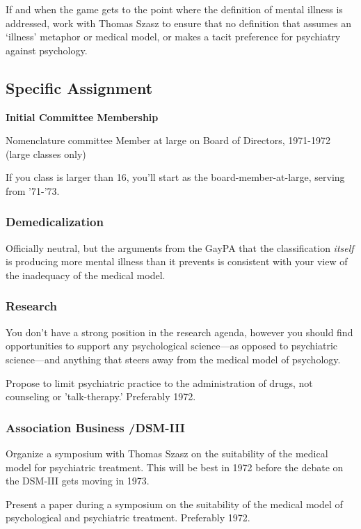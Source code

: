 \begin{refsection}
If and when the game gets to the point where the definition of mental illness is addressed, work with Thomas Szasz to ensure that no definition that assumes an ‘illness’ metaphor or medical model, or makes a tacit preference for psychiatry against psychology.

\subsection{Specific Assignment}
\label{specificassignment}

\textbf{Initial Committee Membership}
\begin{service}[Albee]\label{service:albee}
Nomenclature committee
Member at large on Board of Directors, 1971-1972 (large classes only)
\end{service}
If you class is larger than 16, you'll start as the board-member-at-large, serving from '71-'73.

\subsubsection{Demedicalization}
\label{demedicalization}

Officially neutral, but the arguments from the GayPA that the classification \emph{itself} is producing more mental illness than it prevents is consistent with your view of the inadequacy of the medical model.

\subsubsection{Research}
\label{research}

You don’t have a strong position in the research agenda, however you should find opportunities to support any psychological science---as opposed to psychiatric science---and anything that steers away from the medical model of psychology.
\begin{proposal}[Albee]\label{proposal:albee}
Propose to limit psychiatric practice to the administration of drugs, not counseling or 'talk-therapy.' Preferably 1972.
\end{proposal}

\subsubsection{Association Business \slash  DSM-III}
\label{associationbusinessdsm-iii}

Organize a symposium with Thomas Szasz on the suitability of the medical model for psychiatric treatment. This will be best in 1972 before the debate on the DSM-III gets moving in 1973.\begin{writingtask}[Albee]\label{writingtask:albee}
Present a paper during a symposium on the suitability of the medical model of psychological and psychiatric treatment. Preferably 1972.
\end{writingtask}


\end{refsection}
